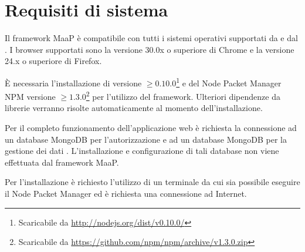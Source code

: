 \section{Requisiti di sistema}

Il framework MaaP è compatibile con tutti i sistemi operativi supportati da  e dal . I browser supportati sono la versione 30.0x o superiore di Chrome e la versione 24.x o superiore di Firefox.

È necessaria l'installazione di  versione $\geq 0.10.0$\footnote{Scaricabile da \url{http://nodejs.org/dist/v0.10.0/}} e del Node Packet Manager NPM versione $\geq 1.3.0$\footnote{Scaricabile da \url{https://github.com/npm/npm/archive/v1.3.0.zip}} per l'utilizzo del framework. Ulteriori dipendenze da librerie verranno risolte automaticamente al momento dell'installazione.

Per il completo funzionamento dell'applicazione web è richiesta la connessione ad un database MongoDB per l'autorizzazione e ad un database MongoDB per la gestione dei dati . L'installazione e configurazione di tali database non viene effettuata dal framework MaaP.

Per l'installazione è richiesto l'utilizzo di un terminale da cui sia possibile eseguire il Node Packet Manager ed è richiesta una connessione ad Internet.
